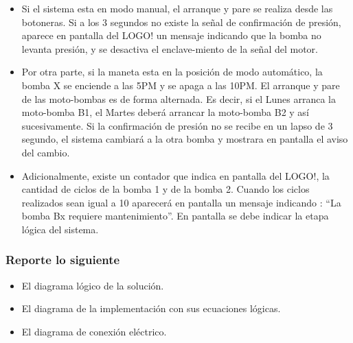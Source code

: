 \begin{itemize}
	\item Si el sistema esta en modo manual, el arranque y pare se realiza desde las botoneras. Si a los 3 segundos no existe la señal de confirmación de presión, aparece en pantalla del LOGO! un mensaje indicando que la bomba no levanta presión, y se desactiva el enclave-miento de  la señal del motor.
	\item Por otra parte, si la maneta esta en la posición de modo automático, la bomba X se enciende a las 5PM y se apaga a las 10PM. El arranque y pare de las moto-bombas es de forma alternada. Es decir, si el Lunes arranca la  moto-bomba B1, el Martes deberá arrancar la moto-bomba B2 y así sucesivamente. Si la confirmación de presión no se recibe en un lapso de 3 segundo, el sistema cambiará a la otra bomba y mostrara en pantalla el aviso del cambio.	
	\item Adicionalmente, existe un contador que indica en pantalla del LOGO!, la cantidad de ciclos de la bomba 1 y de la bomba 2. Cuando los ciclos realizados sean igual a 10 aparecerá en pantalla un mensaje indicando : “La bomba Bx requiere mantenimiento”. En pantalla se debe indicar la etapa lógica del sistema.
\end{itemize} 

\subsubsection{Reporte lo siguiente}

\begin{itemize}
	\item El diagrama lógico de la solución.
	\item El diagrama de la implementación con sus ecuaciones lógicas.
	\item El diagrama de conexión eléctrico.
\end{itemize}




